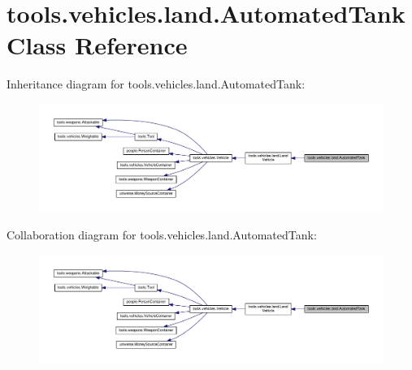 \hypertarget{classtools_1_1vehicles_1_1land_1_1_automated_tank}{}\section{tools.\+vehicles.\+land.\+Automated\+Tank Class Reference}
\label{classtools_1_1vehicles_1_1land_1_1_automated_tank}


Inheritance diagram for tools.\+vehicles.\+land.\+Automated\+Tank\+:
\nopagebreak
\begin{figure}[H]
\begin{center}
\leavevmode
\includegraphics[width=350pt]{classtools_1_1vehicles_1_1land_1_1_automated_tank__inherit__graph}
\end{center}
\end{figure}


Collaboration diagram for tools.\+vehicles.\+land.\+Automated\+Tank\+:
\nopagebreak
\begin{figure}[H]
\begin{center}
\leavevmode
\includegraphics[width=350pt]{classtools_1_1vehicles_1_1land_1_1_automated_tank__coll__graph}
\end{center}
\end{figure}
